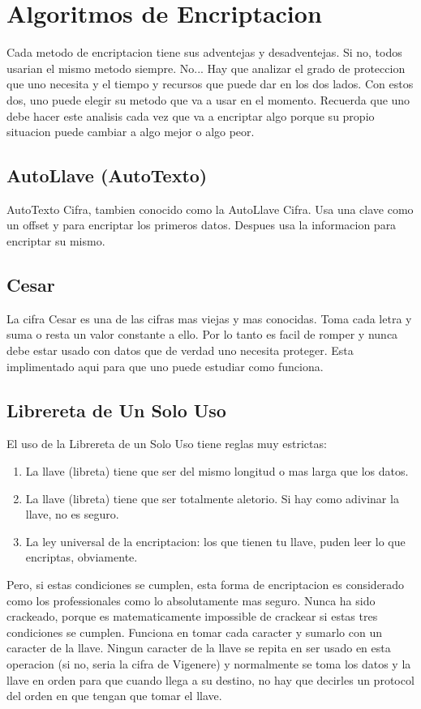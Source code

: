 \documentclass{article}
\begin{document}
	\section{Algoritmos de Encriptacion}
		Cada metodo de encriptacion tiene sus adventejas y desadventejas. Si no, todos usarian el mismo metodo siempre. No... Hay que analizar el grado de proteccion que uno necesita y el tiempo y recursos que puede dar en los dos lados. Con estos dos, uno puede elegir su metodo que va a usar en el momento. Recuerda que uno debe hacer este analisis cada vez que va a encriptar algo porque su propio situacion puede cambiar a algo mejor o algo peor.
		\subsection{AutoLlave (AutoTexto)}
			AutoTexto Cifra, tambien conocido como la AutoLlave Cifra. Usa una clave como un offset y para encriptar los primeros datos. Despues usa la informacion para encriptar su mismo.
		\subsection{Cesar}
			La cifra Cesar es una de las cifras mas viejas y mas conocidas. Toma cada letra y suma o resta un valor constante a ello. Por lo tanto es facil de romper y nunca debe estar usado con datos que de verdad uno necesita proteger. Esta implimentado aqui para que uno puede estudiar como funciona.
		\subsection{Librereta de Un Solo Uso}
			El uso de la Librereta de un Solo Uso tiene reglas muy estrictas:
			\begin{enumerate}  
				\item La llave (libreta) tiene que ser del mismo longitud o mas larga que los datos.
				\item La llave (libreta) tiene que ser totalmente aletorio. Si hay como adivinar la llave, no es seguro.
				\item La ley universal de la encriptacion: los que tienen tu llave, puden leer lo que encriptas, obviamente.
			\end{enumerate}  
			Pero, si estas condiciones se cumplen, esta forma de encriptacion es considerado como los professionales como lo absolutamente mas seguro. Nunca ha sido crackeado, porque es matematicamente impossible de crackear si estas tres condiciones se cumplen. Funciona en tomar cada caracter y sumarlo con un caracter de la llave. Ningun caracter de la llave se repita en ser usado en esta operacion (si no, seria la cifra de Vigenere) y normalmente se toma los datos y la llave en orden para que cuando llega a su destino, no hay que decirles un protocol del orden en que tengan que tomar el llave.
\end{document}

